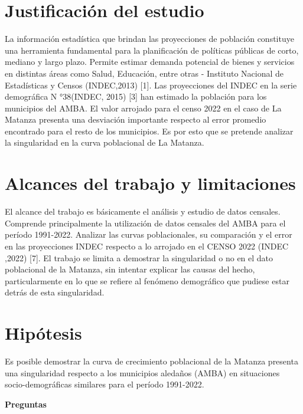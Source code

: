 \documentclass{article}
\theoremstyle{mytheoremstyle}
\theoremstyle{mytheoremstyle}
\theoremstyle{myproblemstyle}
\begin{document}
\section{Justificación del estudio}
La información estadística que brindan las proyecciones de población constituye una herramienta fundamental para la planificación de políticas públicas de corto, mediano y largo plazo. Permite estimar demanda potencial de bienes y servicios en distintas áreas como Salud, Educación, entre otras - Instituto Nacional de Estadísticas y Censos (INDEC,2013) [1].
Las proyecciones del INDEC en la serie demográfica N °38(INDEC, 2015) [3] han estimado la población para los municipios del AMBA. El valor arrojado para el censo 2022 en el caso de La Matanza presenta una desviación importante respecto al error promedio encontrado para el resto de los municipios. Es por esto que se pretende analizar la singularidad en la curva poblacional de La Matanza.

\section{ Alcances del trabajo y limitaciones}
El alcance del trabajo es básicamente el análisis y estudio de datos censales. Comprende principalmente la utilización de datos censales del AMBA para el período 1991-2022. Analizar las curvas poblacionales, su comparación y el error en las proyecciones INDEC respecto a lo arrojado en el CENSO 2022 (INDEC ,2022) [7].  El trabajo se limita a demostrar la singularidad o no en el dato poblacional de la Matanza, sin intentar explicar las causas del hecho, particularmente en lo que se refiere al fenómeno 
demográfico que pudiese estar detrás de esta singularidad.
\section{Hipótesis}
Es posible demostrar la curva de crecimiento poblacional de la Matanza presenta una singularidad respecto a los municipios aledaños (AMBA) en situaciones socio-demográficas 
similares para el período 1991-2022. 

\textbf{Preguntas}

\end{document}
